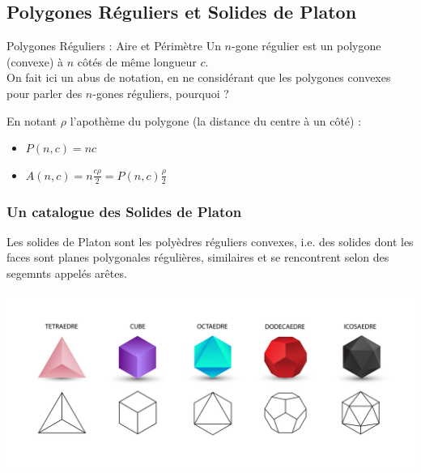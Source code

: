 \documentclass{beamercours}
\begin{document}
        \subsection{Polygones Réguliers et Solides de Platon}
            \begin{frame}{Polygones Réguliers : Aire et Périmètre}
                Un $n$-gone régulier est un polygone (convexe) à $n$ côtés de même longueur $c$.\\
                On fait ici un abus de notation, en ne considérant que les polygones convexes pour parler des $n$-gones réguliers, pourquoi ?
                \begin{theorem}
                    En notant $\rho$ l'apothème du polygone (la distance du centre à un côté) :
                    \begin{itemize}
                        \item $P(n, c) = nc$
                        \item $A(n, c) = n\frac{c\rho}{2} = P(n, c)\frac{\rho}{2}$
                    \end{itemize}
                \end{theorem}
            \end{frame}

            \begin{frame}
                \frametitle{Un catalogue des Solides de Platon}
                \begin{definition}
                    Les solides de Platon sont les polyèdres réguliers convexes, i.e. des solides dont les faces sont planes polygonales régulières, similaires et se rencontrent selon des segemnts appelés arêtes.
                \end{definition}
                \begin{center}
                    \includegraphics{solides-de-platon-02.jpg}    
                \end{center}
                
            \end{frame}
\end{document}
